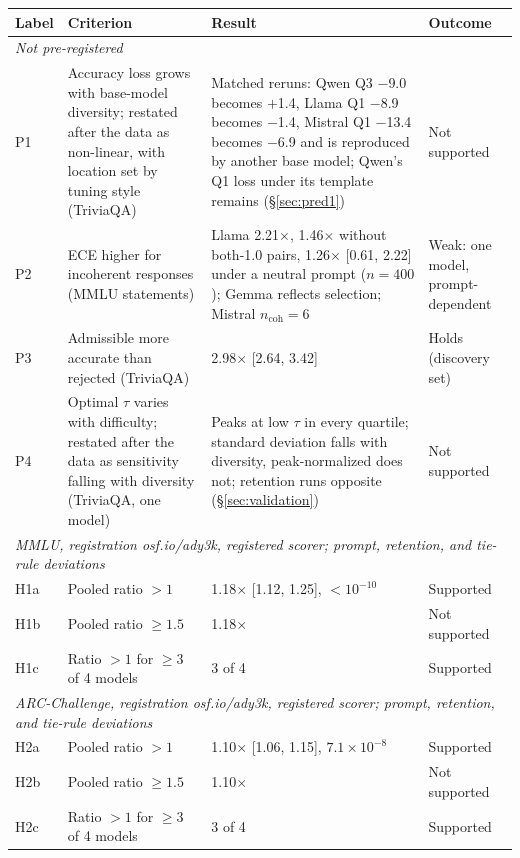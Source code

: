 \begin{table}[p]
\centering
\footnotesize
\setlength{\tabcolsep}{4pt}
\begin{tabular}{@{}lp{5.0cm}p{5.9cm}>{\raggedright\arraybackslash}p{2.2cm}@{}}
\toprule
Label & Criterion & Result & Outcome \\
\midrule
\multicolumn{4}{l}{\textit{Not pre-registered}} \\
P1 & Accuracy loss grows with base-model diversity; restated after the data as non-linear, with location set by tuning style (TriviaQA) & Matched reruns: Qwen Q3 $-$9.0 becomes $+$1.4, Llama Q1 $-$8.9 becomes $-$1.4, Mistral Q1 $-$13.4 becomes $-$6.9 and is reproduced by another base model; Qwen's Q1 loss under its template remains (\S\ref{sec:pred1}) & Not supported \\
P2 & ECE higher for incoherent responses (MMLU statements) & Llama 2.21$\times$, 1.46$\times$ without both-1.0 pairs, 1.26$\times$ [0.61, 2.22] under a neutral prompt ($n=400$); Gemma reflects selection; Mistral $n_{\text{coh}}=6$ & Weak: one model, prompt-dependent \\
P3 & Admissible more accurate than rejected (TriviaQA) & 2.98$\times$ [2.64, 3.42] & Holds (discovery set) \\
P4 & Optimal $\tau$ varies with difficulty; restated after the data as sensitivity falling with diversity (TriviaQA, one model) & Peaks at low $\tau$ in every quartile; standard deviation falls with diversity, peak-normalized does not; retention runs opposite (\S\ref{sec:validation}) & Not supported \\
\midrule
\multicolumn{4}{l}{\textit{MMLU, registration osf.io/ady3k, registered scorer; prompt, retention, and tie-rule deviations}} \\
H1a & Pooled ratio $>1$ & 1.18$\times$ [1.12, 1.25], $<10^{-10}$ & Supported \\
H1b & Pooled ratio $\geq 1.5$ & 1.18$\times$ & Not supported \\
H1c & Ratio $>1$ for $\geq 3$ of 4 models & 3 of 4 & Supported \\
\midrule
\multicolumn{4}{l}{\textit{ARC-Challenge, registration osf.io/ady3k, registered scorer; prompt, retention, and tie-rule deviations}} \\
H2a & Pooled ratio $>1$ & 1.10$\times$ [1.06, 1.15], $7.1\times 10^{-8}$ & Supported \\
H2b & Pooled ratio $\geq 1.5$ & 1.10$\times$ & Not supported \\
H2c & Ratio $>1$ for $\geq 3$ of 4 models & 3 of 4 & Supported \\

\end{tabular}
\end{table}
